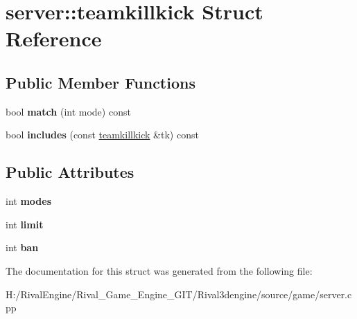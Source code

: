 \hypertarget{structserver_1_1teamkillkick}{}\section{server\+:\+:teamkillkick Struct Reference}
\label{structserver_1_1teamkillkick}
\subsection*{Public Member Functions}
\begin{DoxyCompactItemize}
\item 
\mbox{\label{structserver_1_1teamkillkick_a9a06361aba7d3cdc5dbeaad76bb52748}} 
bool {\bfseries match} (int mode) const
\item 
\mbox{\label{structserver_1_1teamkillkick_ab59e2d796beb619bf339ff347eac93b2}} 
bool {\bfseries includes} (const \hyperlink{structserver_1_1teamkillkick}{teamkillkick} \&tk) const
\end{DoxyCompactItemize}
\subsection*{Public Attributes}
\begin{DoxyCompactItemize}
\item 
\mbox{\label{structserver_1_1teamkillkick_a545070d22fc7fdba1ee8dff5dec06024}} 
int {\bfseries modes}
\item 
\mbox{\label{structserver_1_1teamkillkick_aecfab7d144517c19379ca733f7c3e21c}} 
int {\bfseries limit}
\item 
\mbox{\label{structserver_1_1teamkillkick_a1310d6f19b0f1512ed170757f6738482}} 
int {\bfseries ban}
\end{DoxyCompactItemize}


The documentation for this struct was generated from the following file\+:\begin{DoxyCompactItemize}
\item 
H\+:/\+Rival\+Engine/\+Rival\+\_\+\+Game\+\_\+\+Engine\+\_\+\+G\+I\+T/\+Rival3dengine/source/game/server.\+cpp\end{DoxyCompactItemize}
